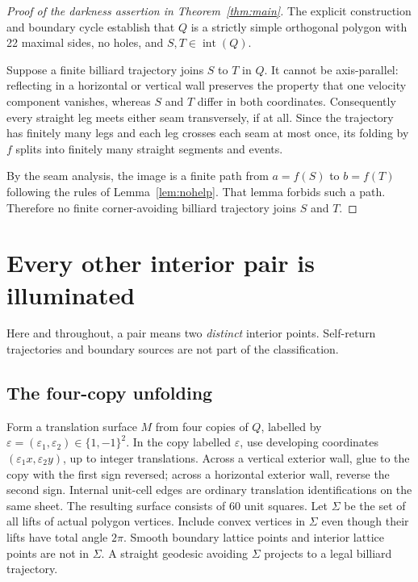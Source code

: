 \documentclass[11pt]{article}
\theoremstyle{remark}
\newcommand{\interior}{\operatorname{int}}
\begin{document}
\begin{proof}[Proof of the darkness assertion in Theorem~\ref{thm:main}]
The explicit construction and boundary cycle establish that $Q$ is a strictly simple orthogonal polygon with 22 maximal sides, no holes, and $S,T\in\interior(Q)$.

Suppose a finite billiard trajectory joins $S$ to $T$ in $Q$. It cannot be axis-parallel: reflecting in a horizontal or vertical wall preserves the property that one velocity component vanishes, whereas $S$ and $T$ differ in both coordinates. Consequently every straight leg meets either seam transversely, if at all. Since the trajectory has finitely many legs and each leg crosses each seam at most once, its folding by $f$ splits into finitely many straight segments and events.

By the seam analysis, the image is a finite path from $a=f(S)$ to $b=f(T)$ following the rules of Lemma~\ref{lem:nohelp}. That lemma forbids such a path. Therefore no finite corner-avoiding billiard trajectory joins $S$ and $T$.
\end{proof}


\section{Every other interior pair is illuminated}\label{sec:cylinders}
Here and throughout, a pair means two \emph{distinct} interior points. Self-return trajectories and boundary sources are not part of the classification.

\subsection{The four-copy unfolding}
Form a translation surface $M$ from four copies of $Q$, labelled by
$\varepsilon=(\varepsilon_1,\varepsilon_2)\in\{1,-1\}^2$.
In the copy labelled $\varepsilon$, use developing coordinates
$(\varepsilon_1x,\varepsilon_2y)$, up to integer translations.
Across a vertical exterior wall, glue to the copy with the first sign reversed;
across a horizontal exterior wall, reverse the second sign. Internal unit-cell
edges are ordinary translation identifications on the same sheet.
The resulting surface consists of 60 unit squares. Let $\Sigma$ be the set
of all lifts of actual polygon vertices. Include convex vertices in $\Sigma$
even though their lifts have total angle $2\pi$.
Smooth boundary lattice points and interior lattice points are not in $\Sigma$.
A straight geodesic avoiding $\Sigma$ projects to a legal billiard trajectory.
\end{document}
